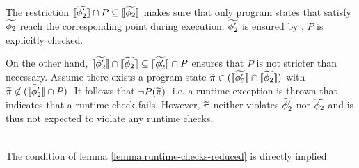 \begin{proofatend}~\\
    The restriction $\llbracket {\widetilde{\phi_2'}} \rrbracket \cap P \subseteq \llbracket {\widetilde{\phi_2}} \rrbracket$ makes sure that only program states that satisfy $\widetilde{\phi_2}$ reach the corresponding point during execution.
    $\widetilde{\phi_2'}$ is ensured by , $P$ is explicitly checked.
    
    On the other hand, $\llbracket {\widetilde{\phi_2'}} \rrbracket \cap \llbracket {\widetilde{\phi_2}} \rrbracket \subseteq \llbracket {\widetilde{\phi_2'}} \rrbracket \cap P$ ensures that $P$ is not stricter than necessary.
    Assume there exists a program state $\widetilde{\pi} \in (\llbracket {\widetilde{\phi_2'}} \rrbracket \cap \llbracket {\widetilde{\phi_2}} \rrbracket)$ with $\widetilde{\pi} \not \in (\llbracket {\widetilde{\phi_2'}} \rrbracket \cap P)$.
    It follows that $\neg P(\widetilde{\pi})$, i.e. a runtime exception is thrown that indicates that a runtime check fails.
    However, $\widetilde{\pi}$ neither violates $\widetilde{\phi_2'}$ nor $\widetilde{\phi_2}$ and is thus not expected to violate any runtime checks.
\end{proofatend}

\begin{proofatend}~\\
    The condition of lemma \ref{lemma:runtime-checks-reduced} is directly implied.
\end{proofatend}

